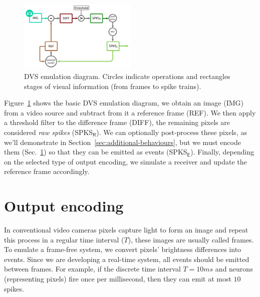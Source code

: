 \documentclass[conference]{IEEEtran}
\begin{document}
%
\begin{figure}[htb]
  \includegraphics[width=0.5\textwidth]{dvs_emu}
  
  \caption{DVS emulation diagram. Circles indicate operations and rectangles stages of visual information (from frames to spike trains).}
  \label{fig:dvs_emu}
\end{figure}

Figure~\ref{fig:dvs_emu} shows the basic DVS emulation diagram, we obtain an image (\textsf{IMG}) from a video source and subtract from it a reference frame (\textsf{REF}). We then apply a threshold filter to the difference frame (\textsf{DIFF}), the remaining pixels are considered \textit{raw spikes} (\textsf{SPKS}$\mathsf{_R}$). We can optionally post-process these pixels, as we'll demonstrate in Section~\ref{sec:additional-behaviours}, but we must encode them (Sec.~\ref{sec:output-modes}) so that they can be emitted as events (\textsf{SPKS}$\mathsf{_E}$). Finally, depending on the selected type of output encoding, we simulate a receiver and update the reference frame accordingly. 


\section{Output encoding}
\label{sec:output-modes}
In conventional video cameras pixels capture light to form an image and repeat this process in a regular time interval ($T$), these images are usually called frames. To emulate a frame-free system, we convert pixels' brightness differences into events. Since we are developing a real-time system, all events should be emitted between frames. For example, if the discrete time interval $T = 10 ms$ and neurons (representing pixels) fire once per millisecond, then they can emit at most $10$ spikes.
\end{document}
